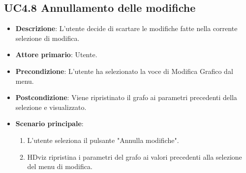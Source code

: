 \subsection{UC4.8 Annullamento delle modifiche}
\label{ssub:uc4.8}
\begin{itemize}
    \item \textbf{Descrizione}: L'utente decide di scartare le modifiche fatte nella corrente selezione di modifica.

    \item \textbf{Attore primario}: Utente.
    
    \item \textbf{Precondizione}:   L'utente ha selezionato la voce di Modifica Grafico dal menu.
    \item \textbf{Postcondizione}:  Viene ripristinato il grafo ai parametri precedenti della selezione e visualizzato.

	\item \textbf{Scenario principale}:
        \begin{enumerate}

            \item L'utente seleziona il pulsante "Annulla modifiche".
            \item HDviz ripristina i parametri del grafo ai valori precedenti alla selezione del menu di modifica.
        
        \end{enumerate}
\end{itemize}



